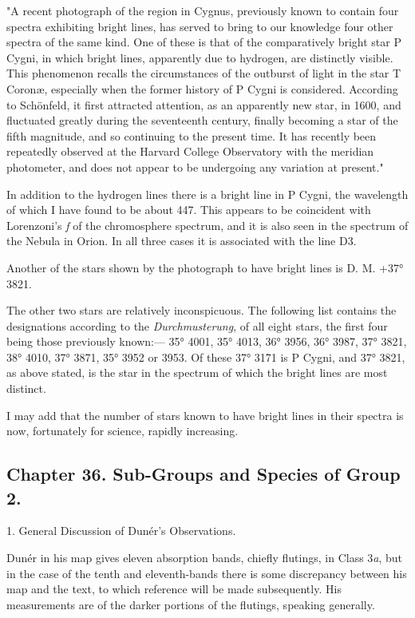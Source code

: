 \documentclass[a4paper, 12pt, oneside, polutonikogreek, english]{article}
\begin{document}
"A recent photograph of the region in Cygnus, previously known to contain four spectra exhibiting bright lines, has served to bring to our knowledge four other spectra of the same kind. One of these is that of the comparatively bright star P Cygni, in which bright lines, apparently due to hydrogen, are distinctly visible. This phenomenon recalls the circumstances of the outburst of light in the star T Coronæ, especially when the former history of P Cygni is considered. According to Schönfeld, it first attracted attention, as an apparently new star, in 1600, and fluctuated greatly during the seventeenth century, finally becoming a star of the fifth magnitude, and so continuing to the present time. It has recently been repeatedly observed at the Harvard College Observatory with the meridian photometer, and does not appear to be undergoing any variation at present."

In addition to the hydrogen lines there is a bright line in P Cygni, the wavelength of which I have found to be about 447. This appears to be coincident with Lorenzoni's \emph{f} of the chromosphere spectrum, and it is also seen in the spectrum of the Nebula in Orion. In all three cases it is associated with the line D3.

Another of the stars shown by the photograph to have bright lines is D. M. +37° 3821.

The other two stars are relatively inconspicuous. The following list contains the designations according to the \emph{Durchmusterung}, of all eight stars, the first four being those previously known:--- 35° 4001, 35° 4013, 36° 3956, 36° 3987, 37° 3821, 38° 4010, 37° 3871, 35° 3952 or 3953. Of these 37° 3171 is P Cygni, and 37° 3821, as above stated, is the star in the spectrum of which the bright lines are most distinct.

I may add that the number of stars known to have bright lines in their spectra is now, fortunately for science, rapidly increasing.

\subsection{Chapter 36. Sub-Groups and Species of Group 2.}

1. General Discussion of Dunér's Observations.

Dunér in his map gives eleven absorption bands, chiefly flutings, in Class 3\emph{a}, but in the case of the tenth and eleventh-bands there is some discrepancy between his map and the text, to which reference will be made subsequently. His measurements are of the darker portions of the flutings, speaking generally.
\end{document}
